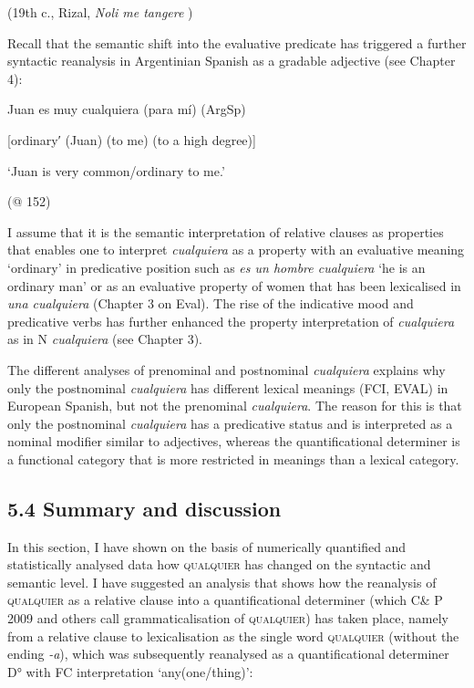\documentclass[output=paper]{langscibook}
\begin{document}
  (19th c., Rizal, \textit{Noli me tangere} )

Recall that the semantic shift into the evaluative predicate has triggered a further syntactic reanalysis in Argentinian Spanish as a gradable adjective (see Chapter 4):

  Juan es muy cualquiera (para mí)  (ArgSp)

  [ordinary′ (Juan) (to me) (to a high degree)]  

  ‘Juan is very common/ordinary to me.’  

    (@ 152)

I assume that it is the semantic interpretation of relative clauses as properties that enables one to interpret \textit{cualquiera} as a property with an evaluative meaning ‘ordinary’ in predicative position such as \textit{es un hombre cualquiera} ‘he is an ordinary man’ or as an evaluative property of women that has been lexicalised in \textit{una cualquiera} (Chapter 3 on Eval). The rise of the indicative mood and predicative verbs has further enhanced the property interpretation of \textit{cualquiera} as in N \textit{cualquiera} (see Chapter 3). 

  The different analyses of prenominal and postnominal \textit{cualquiera} explains why only the postnominal \textit{cualquiera} has different lexical meanings (FCI, EVAL) in European Spanish, but not the prenominal \textit{cualquiera}. The reason for this is that only the postnominal \textit{cualquiera} has a predicative status and is interpreted as a nominal modifier similar to adjectives, whereas the quantificational determiner is a functional category that is more restricted in meanings than a lexical category.

\subsection{\textbf{5.4} \textbf{Summary} \textbf{and} \textbf{discussion}}

In this section, I have shown on the basis of numerically quantified and statistically analysed data how \textsc{qualquier} has changed on the syntactic and semantic level. I have suggested an analysis that shows how the reanalysis of \textsc{qualquier} as a relative clause into a quantificational determiner (which C\& P 2009 and others call grammaticalisation of \textsc{qualquier}) has taken place, namely from a relative clause to lexicalisation as the single word \textsc{qualquier} (without the ending \textit{{}-a}), which was subsequently reanalysed as a quantificational determiner D° with FC interpretation ‘any(one/thing)’:
\end{document}
